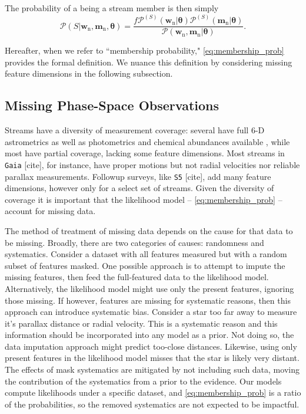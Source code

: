 \documentclass[twocolumn]{aastex631}
\newcommand{\dataarchive}[1]{\texttt{#1}}
\newcommand{\Gaia}{\dataarchive{Gaia}}
\newcommand{\mrm}[1]{\mathrm{#1}}
\newcommand{\mbs}[1]{\boldsymbol{#1}}
\newcommand{\mcal}[1]{\mathcal{#1}}
\newcommand{\pdf}{\mcal{P}}
\newcommand{\nth}[1]{{#1}_{\mrm{n}}}  %
\newcommand{\smallcomponent}[2]{#2^{\scriptscriptstyle (#1)}}
\newcommand{\cmp}[2]{\smallcomponent{#1}{#2}}
\newcommand{\Scmp}[1]{\cmp{S}{#1}}
\newcommand{\Spdf}{\Scmp{\pdf}}
\begin{document}
        The probability of a being a stream member is then simply
        \begin{equation}\label{eq:membership_prob}
            \pdf\left(S | \nth{\mbs{w}}, \nth{\mbs{m}}, \mbs{\theta} \right) = \frac{f \Spdf(\nth{\mbs{w}}|\mbs{\theta}) \Spdf(\nth{\mbs{m}}|\mbs{\theta}) }{ \pdf(\nth{\mbs{w}}, \nth{\mbs{m}} | \mbs{\theta})}.
        \end{equation}

        Hereafter, when we refer to ``membership probability,"
        \autoref{eq:membership_prob} provides the formal definition. We nuance
        this definition by considering missing feature dimensions in the
        following subsection.

    \subsection{Missing Phase-Space Observations} \label{sub:method:missing_data}

        Streams have a diversity of measurement coverage: several have full 6-D
        astrometrics as well as photometrics and chemical abundances available
        \citep[e.g.,][]{Koposov+2019, Antoja+2020, Li+2022},
        while most have partial coverage, lacking some feature dimensions.
        Most streams in \Gaia {\color{red} [cite]}, for instance, have proper
        motions but not radial velocities nor reliable parallax measurements.
        Followup surveys, like \dataarchive{S5} {\color{red} [cite]}, add many
        feature dimensions, however only for a select set of streams. Given the
        diversity of coverage it is important that the likelihood model --
        \autoref{eq:membership_prob} -- account for missing data.

        The method of treatment of missing data depends on the cause for that
        data to be missing.  Broadly, there are two categories of causes:
        randomness and systematics.  Consider a dataset with all features
        measured but with a random subset of features masked.  One possible
        approach is to attempt to impute the missing features, then feed the
        full-featured data to the likelihood model. Alternatively, the
        likelihood model might use only the present features, ignoring those
        missing. If however, features are missing for systematic reasons, then
        this approach can introduce systematic bias. Consider a star too far
        away to measure it's parallax distance or radial velocity. This is a
        systematic reason and this information should be incorporated into any
        model as a prior. Not doing so, the data imputation approach might
        predict too-close distances. Likewise, using only present features in
        the likelihood model misses that the star is likely very distant.  The
        effects of mask systematics are mitigated by not including such data,
        moving the contribution of the systematics from a prior to the evidence.
        Our models compute likelihoods under a specific dataset, and
        \autoref{eq:membership_prob} is a ratio of the probabilities, so the
        removed systematics are not expected to be impactful.
\end{document}
